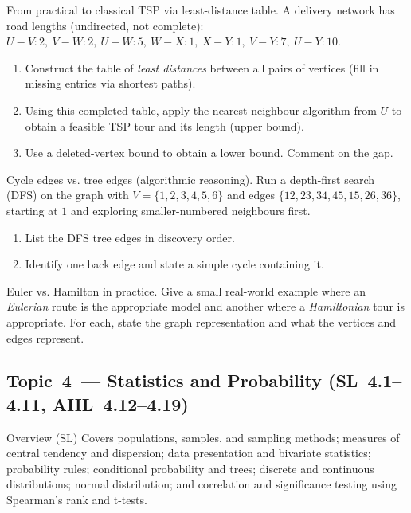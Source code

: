 \documentclass[11pt]{article}
\def\textbf#1{#1}%
\newcommand{\tocsubsection}[1]{\subsection{#1}}
\newcounter{question}
\begin{document}
\begin{question}
\textbf{From practical to classical TSP via least-distance table.}
A delivery network has road lengths (undirected, not complete): 
$U\!-\!V:2,\ V\!-\!W:2,\ U\!-\!W:5,\ W\!-\!X:1,\ X\!-\!Y:1,\ V\!-\!Y:7,\ U\!-\!Y:10$.
\begin{enumerate}
  \item Construct the table of \emph{least distances} between all pairs of vertices (fill in missing entries via shortest paths).
  \item Using this completed table, apply the nearest neighbour algorithm from $U$ to obtain a feasible TSP tour and its length (upper bound).
  \item Use a deleted-vertex bound to obtain a lower bound. Comment on the gap.
\end{enumerate}
\end{question}

\begin{question}
\textbf{Cycle edges vs. tree edges (algorithmic reasoning).}
Run a depth-first search (DFS) on the graph with $V=\{1,2,3,4,5,6\}$ and edges
$\{12,23,34,45,15,26,36\}$, starting at $1$ and exploring smaller-numbered neighbours first.
\begin{enumerate}
  \item List the DFS tree edges in discovery order.
  \item Identify one back edge and state a simple cycle containing it.
\end{enumerate}
\end{question}

\begin{question}
\textbf{Euler vs. Hamilton in practice.}
Give a small real-world example where an \emph{Eulerian} route is the appropriate model and another where a \emph{Hamiltonian} tour is appropriate. For each, state the graph representation and what the vertices and edges represent.
\end{question}





\tocsubsection{Topic 4 — Statistics and Probability (SL 4.1–4.11, AHL 4.12–4.19)}
\textbf{Overview (SL)}  
Covers populations, samples, and sampling methods; measures of central tendency and dispersion; data presentation and bivariate statistics; probability rules; conditional probability and trees; discrete and continuous distributions; normal distribution; and correlation and significance testing using Spearman’s rank and t-tests.
\end{document}
